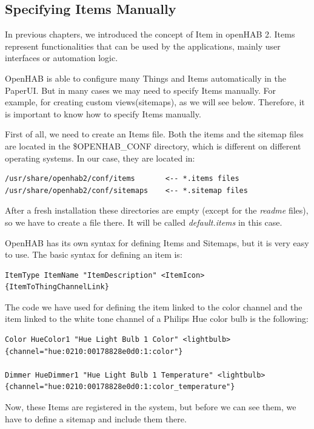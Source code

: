 \subsection{Specifying Items Manually}
In previous chapters, we introduced the concept of Item in openHAB 2. Items represent functionalities that can be used by the
applications, mainly user interfaces or automation logic.

OpenHAB is able to configure many Things and Items automatically in the PaperUI. But in many cases we may need to specify Items
manually. For example, for creating custom views(sitemaps), as we will see below. Therefore, it is important to know how to specify
Items manually.

First of all, we need to create an Items file. Both the items and the sitemap files are located in the \$OPENHAB\_CONF directory,
which is different on different operating systems. In our case, they are located in:

\begin{lstlisting}[style=Consola]
/usr/share/openhab2/conf/items       <-- *.items files
/usr/share/openhab2/conf/sitemaps    <-- *.sitemap files
\end{lstlisting}

After a fresh installation these directories are empty (except for the \textit{readme} files), so we have to create a file there.
It will be called \textit{default.items} in this case.

OpenHAB has its own syntax for defining Items and Sitemaps, but it is very easy to use. The basic syntax for defining an item is:

\begin{lstlisting}[style=Consola]
ItemType ItemName "ItemDescription" <ItemIcon> {ItemToThingChannelLink}
\end{lstlisting}

The code we have used for defining the item linked to the color channel and the item linked to the white tone channel of a Philips
Hue color bulb is the following:

\begin{lstlisting}[style=Consola]
Color HueColor1 "Hue Light Bulb 1 Color" <lightbulb> {channel="hue:0210:00178828e0d0:1:color"}

Dimmer HueDimmer1 "Hue Light Bulb 1 Temperature" <lightbulb> {channel="hue:0210:00178828e0d0:1:color_temperature"}
\end{lstlisting}

Now, these Items are registered in the system, but before we can see them, we have to define a sitemap and include them there.

